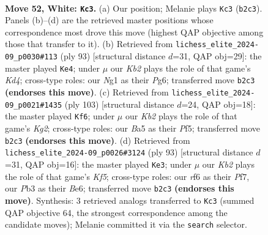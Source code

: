 \documentclass[11pt]{article}
\begin{document}
\clearpage

\begin{figure}[p]\centering
\begin{subfigure}{0.46\textwidth}\centering
\resizebox{\linewidth}{!}{%
\newchessgame
\chessboard[
  setfen={6B1/3k4/5r2/B7/P4pbp/1P6/1K6/5RN1 w - - 3 52},
  showmover=false,
  pgfstyle=straightmove, color=movearrow, markmove={b2-c3}
]}
\caption{}
\end{subfigure}\hfill
\begin{subfigure}{0.46\textwidth}\centering
\resizebox{\linewidth}{!}{%
\newchessgame
\chessboard[
  setfen={2R5/8/6p1/3kp1P1/3b4/8/r1PBK3/8 b - - 2 47},
  showmover=false,
  pgfstyle=straightmove, color=movearrow, markmove={d5-e4}
]}
\caption{}
\end{subfigure}
\\[4pt]
\begin{subfigure}{0.46\textwidth}\centering
\resizebox{\linewidth}{!}{%
\newchessgame
\chessboard[
  setfen={R7/5pk1/2p5/P1Bn1p2/r7/8/4P1K1/8 b - - 4 52},
  showmover=false,
  pgfstyle=straightmove, color=movearrow, markmove={g7-f6}
]}
\caption{}
\end{subfigure}\hfill
\begin{subfigure}{0.46\textwidth}\centering
\resizebox{\linewidth}{!}{%
\newchessgame
\chessboard[
  setfen={8/5p2/4b3/R3P2p/5k1P/2p5/2r3BK/8 b - - 1 47},
  showmover=false,
  pgfstyle=straightmove, color=movearrow, markmove={f4-e3}
]}
\caption{}
\end{subfigure}
\caption{\textbf{Move 52, White: \texttt{Kc3}.} (a) Our position; Melanie plays \texttt{Kc3} (\texttt{b2c3}). Panels (b)--(d) are the retrieved master positions whose correspondence most drove this move (highest QAP objective among those that transfer to it). (b) Retrieved from \texttt{lichess\_elite\_2024-09\_p0030\#113} (ply 93) [structural distance $d$=31, QAP obj=29]: the master played \texttt{Ke4}; under $\mu$ our \emph{Kb2} plays the role of that game's \emph{Kd4}; cross-type roles: our \emph{N}g1 as their \emph{P}g6; transferred move \texttt{b2c3} \textbf{(endorses this move)}. (c) Retrieved from \texttt{lichess\_elite\_2024-09\_p0021\#1435} (ply 103) [structural distance $d$=24, QAP obj=18]: the master played \texttt{Kf6}; under $\mu$ our \emph{Kb2} plays the role of that game's \emph{Kg2}; cross-type roles: our \emph{B}a5 as their \emph{P}f5; transferred move \texttt{b2c3} \textbf{(endorses this move)}. (d) Retrieved from \texttt{lichess\_elite\_2024-09\_p0026\#3124} (ply 93) [structural distance $d$=31, QAP obj=16]: the master played \texttt{Ke3}; under $\mu$ our \emph{Kb2} plays the role of that game's \emph{Kf5}; cross-type roles: our \emph{r}f6 as their \emph{P}f7, our \emph{P}b3 as their \emph{B}e6; transferred move \texttt{b2c3} \textbf{(endorses this move)}. Synthesis: 3 retrieved analogs transferred to \texttt{Kc3} (summed QAP objective 64, the strongest correspondence among the candidate moves); Melanie committed it via the \texttt{search} selector.}
\label{fig:thought-m102}
\end{figure}
\end{document}
